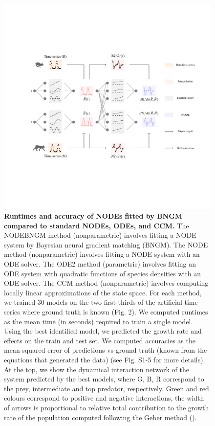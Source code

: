 \documentclass[11pt, oneside]{article}
\begin{document}
\newpage
\begin{figure}[H]
\begin{center}
\includegraphics[width=\linewidth,page=4]{figures/main.pdf}
\caption{
    \textbf{Runtimes and accuracy of NODEs fitted by BNGM compared to standard NODEs, ODEs, and CCM.} 
    The NODEBNGM method (nonparametric) involves fitting a NODE system by Bayesian neural gradient matching (BNGM).
    The NODE method (nonparametric) involves fitting a NODE system with an ODE solver. 
    The ODE2 method (parametric) involves fitting an ODE system with quadratic functions of species densities with an ODE solver. 
    The CCM method (nonparametric) involves computing locally linear approximations of the state space. 
    For each method, we trained 30 models on the two first thirds of the artificial time series where ground truth is known (Fig. 2). 
    We computed runtimes as the mean time (in seconds) required to train a single model. 
    Using the best identified model, we predicted the growth rate and effects on the train and test set. 
    We computed accuracies as the mean squared error of predictions vs ground truth (known from the equations that generated the data) (see Fig. S1-5 for more details). 
    At the top, we show the dynamical interaction network of the system predicted by the best models, where G, B, R correspond to the prey, intermediate and top predator, respectively.
    Green and red colours correspond to positive and negative interactions, the width of arrows is proportional to relative total contribution to the growth rate of the population computed following the Geber method (\cite{Hairston2005,Bonnaffe2021a}).
}
\end{center}
\end{figure}
\newpage
\end{document}
